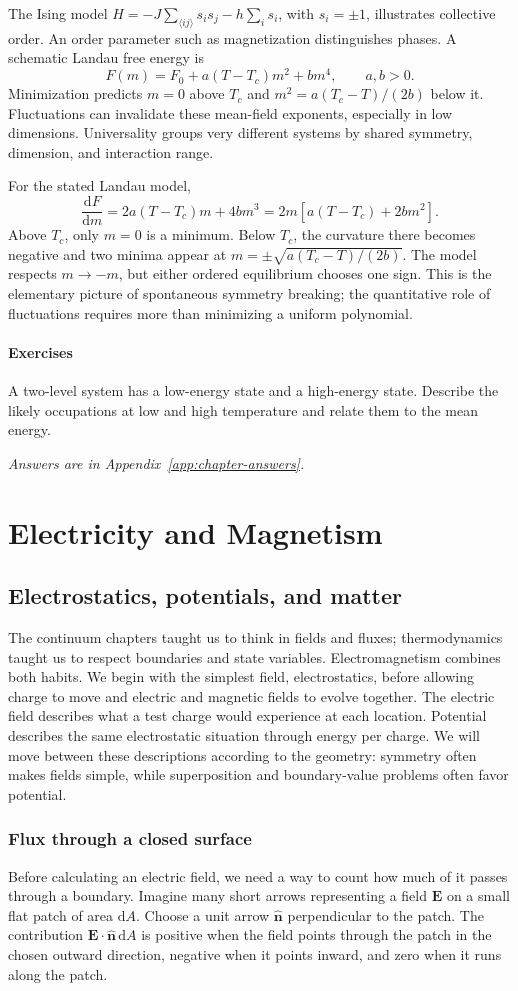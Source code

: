 \documentclass[11pt,oneside]{book}
\newcommand{\dd}{\mathrm{d}}
\newcommand{\vect}[1]{\boldsymbol{#1}}
\newcommand{\od}[2]{\frac{\dd #1}{\dd #2}}
\theoremstyle{reviewstyle}
\newcommand{\learningcheck}[1]{\subsection*{Exercises}\noindent #1\par\smallskip\noindent\emph{Answers are in Appendix~\ref{app:chapter-answers}.}}
\begin{document}
The Ising model $H=-J\sum_{\langle ij\rangle}s_is_j-h\sum_i s_i$, with $s_i=\pm1$, illustrates collective order. An order parameter such as magnetization distinguishes phases. A schematic Landau free energy is
\begin{equation}F(m)=F_0+a(T-T_c)m^2+bm^4,\qquad a,b>0.\end{equation}
Minimization predicts $m=0$ above $T_c$ and $m^2=a(T_c-T)/(2b)$ below it. Fluctuations can invalidate these mean-field exponents, especially in low dimensions. Universality groups very different systems by shared symmetry, dimension, and interaction range.

For the stated Landau model,
\begin{equation}
\od Fm=2a(T-T_c)m+4bm^3
=2m[a(T-T_c)+2bm^2].
\end{equation}
Above $T_c$, only $m=0$ is a minimum. Below $T_c$, the curvature there becomes negative and two minima appear at $m=\pm\sqrt{a(T_c-T)/(2b)}$. The model respects $m\to-m$, but either ordered equilibrium chooses one sign. This is the elementary picture of spontaneous symmetry breaking; the quantitative role of fluctuations requires more than minimizing a uniform polynomial.

\learningcheck{A two-level system has a low-energy state and a high-energy state. Describe the likely occupations at low and high temperature and relate them to the mean energy.}

\part{Electricity and Magnetism}
\chapter{Electrostatics, potentials, and matter}
The continuum chapters taught us to think in fields and fluxes; thermodynamics taught us to respect boundaries and state variables. Electromagnetism combines both habits. We begin with the simplest field, electrostatics, before allowing charge to move and electric and magnetic fields to evolve together.
The electric field describes what a test charge would experience at each location. Potential describes the same electrostatic situation through energy per charge. We will move between these descriptions according to the geometry: symmetry often makes fields simple, while superposition and boundary-value problems often favor potential.

\section{Flux through a closed surface}
Before calculating an electric field, we need a way to count how much of it passes through a boundary. Imagine many short arrows representing a field $\vect E$ on a small flat patch of area $\dd A$. Choose a unit arrow $\hat{\vect n}$ perpendicular to the patch. The contribution $\vect E\cdot\hat{\vect n}\,\dd A$ is positive when the field points through the patch in the chosen outward direction, negative when it points inward, and zero when it runs along the patch.
\end{document}
